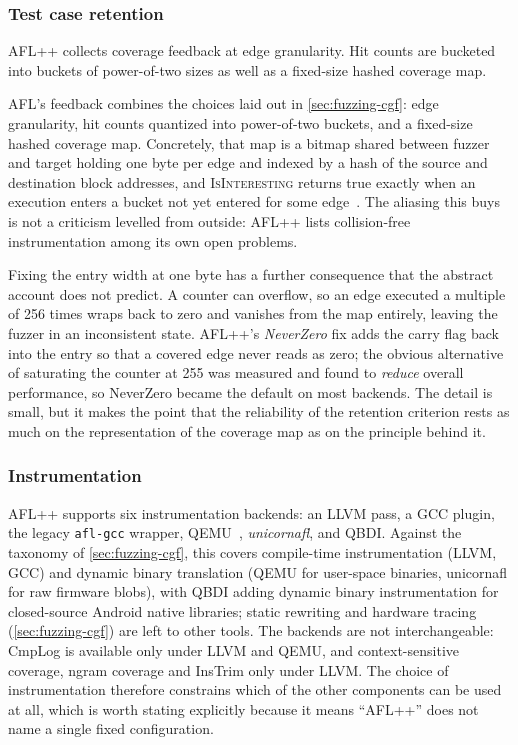 \subsubsection{Test case retention}

AFL++ collects coverage feedback at edge granularity.
Hit counts are bucketed into buckets of power-of-two sizes as well as a fixed-size hashed coverage map.


AFL's feedback combines the choices laid out in \cref{sec:fuzzing-cgf}: edge granularity,
hit counts quantized into power-of-two buckets, and a fixed-size hashed coverage map.
Concretely, that map is a bitmap shared between fuzzer and target holding one byte per
edge and indexed by a hash of the source and destination block addresses, and
\textsc{IsInteresting} returns true exactly when an execution enters a bucket not yet
entered for some edge~\cite{fioraldi_afl_nodate}.
The aliasing this buys is not a criticism levelled from outside: AFL++ lists collision-free
instrumentation among its own open problems.

Fixing the entry width at one byte has a further consequence that the abstract account does
not predict.
A counter can overflow, so an edge executed a multiple of 256 times wraps back to zero and
vanishes from the map entirely, leaving the fuzzer in an inconsistent state.
AFL++'s \emph{NeverZero} fix adds the carry flag back into the entry so that a covered edge
never reads as zero; the obvious alternative of saturating the counter at 255 was measured
and found to \emph{reduce} overall performance, so NeverZero became the default on most
backends.
The detail is small, but it makes the point that the reliability of the retention criterion
rests as much on the representation of the coverage map as on the principle behind it.

\subsubsection{Instrumentation}

AFL++ supports six instrumentation backends: an LLVM pass, a GCC plugin, the legacy
\texttt{afl-gcc} wrapper, QEMU~\cite{bellard_qemu_2005}, \emph{unicornafl}, and QBDI.
Against the taxonomy of \cref{sec:fuzzing-cgf}, this covers compile-time instrumentation (LLVM, GCC) and
dynamic binary translation (QEMU for user-space binaries, unicornafl for raw firmware
blobs), with QBDI adding dynamic binary instrumentation for closed-source Android native
libraries; static rewriting and hardware tracing (\cref{sec:fuzzing-cgf}) are left to other
tools.
The backends are not interchangeable: CmpLog is available only under LLVM and QEMU, and
context-sensitive coverage, ngram coverage and InsTrim only under LLVM.
The choice of instrumentation therefore constrains which of the other components can be
used at all, which is worth stating explicitly because it means \enquote{AFL++} does not
name a single fixed configuration.

